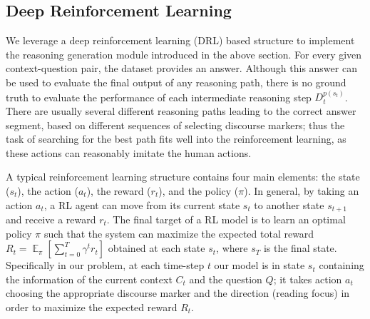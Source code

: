 \subsection{Deep Reinforcement Learning}\label{sec2intuition}

We leverage a deep reinforcement learning (DRL) based structure to implement the reasoning generation module introduced in the above section. 
For every given context-question pair, the dataset provides an answer. Although this answer can be used to evaluate the final output of any reasoning path, there is no ground truth to evaluate the performance of each intermediate reasoning step $D^{p(s_t)}_t$. There are usually several different reasoning paths leading to the correct answer segment, based on different sequences of selecting discourse markers; thus the  task of searching for the best path fits well into the reinforcement learning, as these actions can reasonably imitate the human actions.


A typical reinforcement learning structure contains four main elements: the state ($s_t$), the action ($a_t$), the reward ($r_t$), and the policy ($\pi$). In general, by taking an action $a_t$, a RL agent can move from its current state $s_t$ to another state $s_{t+1}$ and receive a reward $r_t$. The final target of a RL model is to learn an optimal policy $\pi$ such that the system can maximize the expected total reward $R_t=\mathop{\mathbb{E}}_\pi[\sum_{t=0}^{T}\gamma^t r_t]$ obtained at each state $s_t$, where $s_T$ is the final state. Specifically in our problem, at each time-step $t$ our model is in state $s_t$ containing the information of the current context $C_t$ and the question $Q$; it takes action $a_t$ choosing the appropriate discourse marker and the direction (reading focus) in order
to maximize the expected reward $R_t$. 

